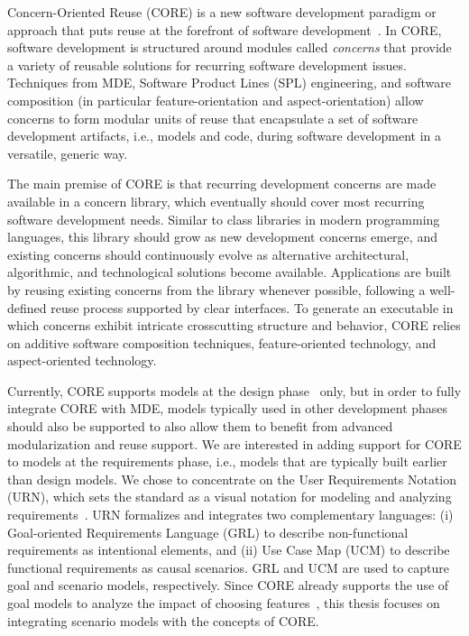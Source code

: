 Concern-Oriented Reuse (CORE) is a new software development paradigm or approach that puts reuse at the forefront of software development~\cite{alam2013concern}. In CORE, software development is structured around modules called \emph{concerns} that provide a variety of reusable solutions for recurring software development issues. Techniques from MDE, Software Product Lines (SPL) engineering, and software composition (in particular feature-orientation and aspect-orientation) allow concerns to form modular units of reuse that encapsulate a set of software development artifacts, i.e., models and code, during software development in a versatile, generic way.

The main premise of CORE is that recurring development concerns are made available in a concern library, which eventually should cover most recurring software development needs. Similar to class libraries in modern programming languages, this library should grow as new development concerns emerge, and existing concerns should continuously evolve as alternative architectural, algorithmic, and technological solutions become available. Applications are built by reusing existing concerns from the library whenever possible, following a well-defined reuse process supported by clear interfaces. To generate an executable in which concerns exhibit intricate crosscutting structure and behavior, CORE relies on additive software composition techniques, feature-oriented technology, and aspect-oriented technology.

Currently, CORE supports models at the design phase~\cite{kienzle2010aspect} only, but in order to fully integrate CORE with MDE, models typically used in other development phases should also be supported to also allow them to benefit from advanced modularization and reuse support. We are interested in adding support for CORE to models at the requirements phase, i.e., models that are typically built earlier than design models. We chose to concentrate on the User Requirements Notation (URN), which sets the standard as a visual notation for modeling and analyzing requirements~\cite{amyot2002urn}. URN formalizes and integrates two complementary languages: (i) Goal-oriented Requirements Language (GRL) to describe non-functional requirements as intentional elements, and (ii) Use Case Map (UCM) to describe functional requirements as causal scenarios. GRL and UCM are used to capture goal and scenario models, respectively. Since CORE already supports the use of goal models to analyze the impact of choosing features~\cite{alam2013concern}, this thesis focuses on integrating scenario models with the concepts of CORE.

